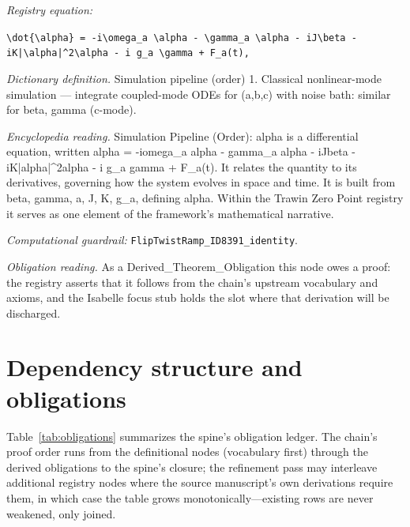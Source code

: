 \documentclass[11pt]{article}
\theoremstyle{remark}
\begin{document}
\noindent\textit{Registry equation:}\par
{\small\texttt{\textbackslash{}dot\{\textbackslash{}alpha\} = -i\textbackslash{}omega\_a \textbackslash{}alpha - \textbackslash{}gamma\_a \textbackslash{}alpha - iJ\textbackslash{}beta - iK|\textbackslash{}alpha|\textasciicircum{}2\textbackslash{}alpha - i g\_a \textbackslash{}gamma + F\_a(t),}}\par\medskip
\noindent\textit{Dictionary definition.} Simulation pipeline (order) 1. Classical nonlinear-mode simulation --- integrate coupled-mode ODEs for (a,b,c) with noise bath: similar for beta, gamma (c-mode).\par\medskip
\noindent\textit{Encyclopedia reading.} Simulation Pipeline (Order): alpha is a differential equation, written alpha = -iomega\_a alpha - gamma\_a alpha - iJbeta - iK|alpha|\textasciicircum{}2alpha - i g\_a gamma + F\_a(t). It relates the quantity to its derivatives, governing how the system evolves in space and time. It is built from beta, gamma, a, J, K, g\_a, defining alpha. Within the Trawin Zero Point registry it serves as one element of the framework's mathematical narrative.
\par\medskip\noindent\textit{Computational guardrail:} \texttt{FlipTwistRamp\_ID8391\_identity}.
\par\medskip\noindent\textit{Obligation reading.} As a Derived\_Theorem\_Obligation this node owes a proof: the registry asserts that it follows from the chain's upstream vocabulary and axioms, and the Isabelle focus stub holds the slot where that derivation will be discharged.

\section{Dependency structure and obligations}
\label{sec:dep}

Table~\ref{tab:obligations} summarizes the spine's obligation ledger. The chain's proof order runs from the definitional nodes (vocabulary first) through the derived obligations to the spine's closure; the refinement pass may interleave additional registry nodes where the source manuscript's own derivations require them, in which case the table grows monotonically---existing rows are never weakened, only joined.
\end{document}
